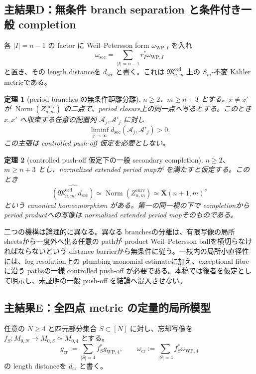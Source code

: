 \documentclass[11pt,a4paper]{ltjsarticle}
\newcommand{\Norm}{\operatorname{Norm}}
\newcommand{\ov}{\overline}
\newcommand{\cA}{\mathcal A}
\newcommand{\Mord}{\mathfrak M^{\mathrm{ord}}}
\theoremstyle{plain}
\newtheorem{theorem}{定理}[section]
\theoremstyle{definition}
\theoremstyle{remark}
\begin{document}
\subsection{主結果D：無条件 branch separation と条件付き一般 completion}
各 $|I|=n-1$ の factor に Weil--Petersson form $\omega_{\mathrm{WP},I}$ を入れ
\begin{equation}
\label{eq:intro-secmetric}
 \omega_{\mathrm{sec}}=
 \sum_{|I|=n-1}r_I^*\omega_{\mathrm{WP},I}
\end{equation}
と置き、その length distanceを $d_{\mathrm{sec}}$ と書く。これは $\Mord_{n,m}$ 上の $S_m$-不変 K\"ahler metricである。

\begin{theorem}[period branches の無条件距離分離]
\label{thm:intro-branch-separation}
$n\ge2$、$m\ge n+3$ とする。$x\ne x'$ が
$\Norm(Z_{n,m}^{\mathrm{curv}})$ の二点で、period closure上の同一点へ写るとする。このとき $x,x'$ へ収束する任意の配置列 $\cA_j,\cA'_j$ に対し
\[
 \liminf_{j\to\infty}d_{\mathrm{sec}}(\cA_j,\cA'_j)>0.
\]
この主張は controlled push-off 仮定を必要としない。
\end{theorem}

\begin{theorem}[controlled push-off 仮定下の一般 secondary completion]
\label{thm:intro-general-completion}
$n\ge2$、$m\ge n+3$ とし、normalized extended period mapが
 を満たすと仮定する。このとき
\begin{equation}
\label{eq:intro-general-completion}
 \widehat{(\Mord_{n,m},d_{\mathrm{sec}})}
 \simeq
 \Norm(Z_{n,m}^{\mathrm{curv}})
 \simeq
 \ov{\mathbf X}(n+1,m)^\nu
\end{equation}
という canonical homeomorphism がある。第一の同一視の下で completionから period productへの写像は normalized extended period mapそのものである。
\end{theorem}

二つの機構は論理的に異なる。異なる branchesの分離は、有限写像の局所 sheetsから一度外へ出る任意の pathが product Weil--Petersson ballを横切らなければならないという distance barrierから無条件に従う。一枝内の局所小直径性には、log resolution上の plumbing monomial estimateに加え、exceptional fibreに沿う pathsの一様 controlled push-off が必要である。本稿では後者を仮定として明示し、未証明の一般 push-off を結論へ混入させない。

\subsection{主結果E：全四点 metric の定量的局所模型}
任意の $N\ge4$ と四元部分集合 $S\subset[N]$ に対し、忘却写像を $f_S:M_{0,N}\to M_{0,S}\simeq M_{0,4}$ とする。
\[
 g_{\mathrm{cr}}:=\sum_{|S|=4}f_S^*g_{\mathrm{WP},4},
 \qquad
 \omega_{\mathrm{cr}}:=\sum_{|S|=4}f_S^*\omega_{\mathrm{WP},4}
\]
の length distanceを $d_{\mathrm{cr}}$ と書く。
\end{document}
